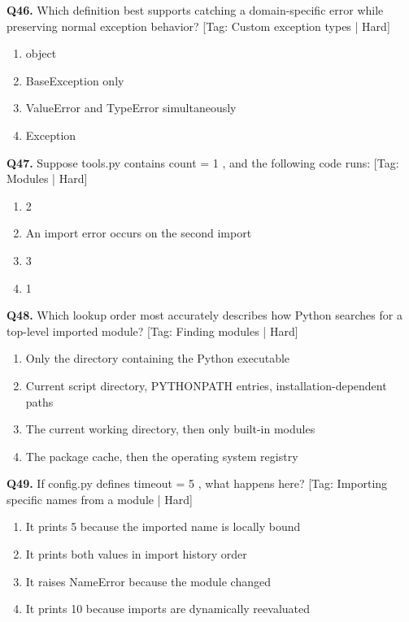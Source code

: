 \vspace{2mm}
\noindent\textbf{Q46.} Which definition best supports catching a domain-specific error while preserving normal exception behavior? \hfill [Tag: Custom exception types | Hard]
\begin{enumerate}[label=(\alph*),topsep=2pt,itemsep=1pt,partopsep=0pt,parsep=0pt]
    \item {object}
    \item {BaseException only}
    \item {ValueError and TypeError simultaneously}
    \item {Exception}
\end{enumerate}
\vspace{2mm}
\noindent\textbf{Q47.} Suppose tools.py contains count = 1 , and the following code runs: \hfill [Tag: Modules | Hard]
\begin{enumerate}[label=(\alph*),topsep=2pt,itemsep=1pt,partopsep=0pt,parsep=0pt]
    \item {2}
    \item {An import error occurs on the second import}
    \item {3}
    \item {1}
\end{enumerate}
\vspace{2mm}
\noindent\textbf{Q48.} Which lookup order most accurately describes how Python searches for a top-level imported module? \hfill [Tag: Finding modules | Hard]
\begin{enumerate}[label=(\alph*),topsep=2pt,itemsep=1pt,partopsep=0pt,parsep=0pt]
    \item {Only the directory containing the Python executable}
    \item {Current script directory, PYTHONPATH entries, installation-dependent paths}
    \item {The current working directory, then only built-in modules}
    \item {The package cache, then the operating system registry}
\end{enumerate}
\vspace{2mm}
\noindent\textbf{Q49.} If config.py defines timeout = 5 , what happens here? \hfill [Tag: Importing specific names from a module | Hard]
\begin{enumerate}[label=(\alph*),topsep=2pt,itemsep=1pt,partopsep=0pt,parsep=0pt]
    \item {It prints 5 because the imported name is locally bound}
    \item {It prints both values in import history order}
    \item {It raises NameError because the module changed}
    \item {It prints 10 because imports are dynamically reevaluated}
\end{enumerate}
